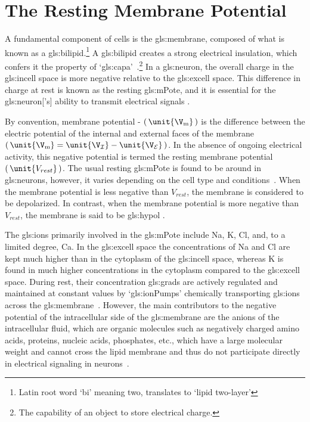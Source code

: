 \documentclass[class={myRUCProject}, crop=false]{standalone}
\begin{document}
\section{The Resting Membrane Potential} 
A fundamental component of cells is the \gls{gls:membrane}, composed of what is known as a \gls{gls:bilipid}.{}\footnote{Latin root word `bi' meaning two, translates to `lipid two-layer'} 
A \gls{gls:bilipid} creates a strong electrical insulation, which confers it the property of `\gls{gls:capa}'~\cite{Hammond2015ch3,Hammond2015ch4}.{}\footnote{The capability of an object to store electrical charge.}
In a \gls{gls:neuron}, the overall charge in the \gls{gls:incell} space is more negative relative to the \gls{gls:excell} space. This difference in charge at rest is known as the resting \gls{gls:mPote}, and it is essential for the \gls{gls:neuron}['s] ability to transmit electrical signals \cite{Hammond2015ch3,Hammond2015ch4}. 

By convention, membrane potential - \(\br{\unit{\V\membrane}}\) is the difference between the electric potential of the internal and external faces of the membrane \(\br{\unit{\V\membrane}=\unit{\V\incell}-\unit{\V\excell}}\). In the absence of ongoing electrical activity, this negative potential is termed the resting membrane potential \(\br{\unit{V_{rest}}}\). The usual resting \gls{gls:mPote} is found to be around  in \glspl{gls:neuron}, however, it varies depending on the cell type and conditions~\cite{Hammond2015ch3,Hammond2015ch4}. When the membrane potential is less negative than \(V_{rest}\), the membrane is considered to be depolarized. In contrast, when the membrane potential is more negative than \(V_{rest}\), the membrane is said to be \gls{gls:hypol} \cite{Hammond2015ch3}. 

The \glspl{gls:ion} primarily involved in the \gls{gls:mPote} include \gls{Na}, \gls{K}, \gls{Cl}, and, to a limited degree, \gls{Ca}. 
In the \gls{gls:excell} space the concentrations of \gls{Na} and \gls{Cl} are kept much higher than in the cytoplasm of the \gls{gls:incell} space, whereas \gls{K} is found in much higher concentrations in the cytoplasm compared to the \gls{gls:excell} space. 
During rest, their concentration \glspl{gls:grad} are actively regulated and maintained at constant values by `\glspl{gls:ionPump}' chemically transporting \glspl{gls:ion} across the \gls{gls:membrane}~\cite{Hammond2015ch3,Hammond2015ch4}. 
However, the main contributors to the negative potential of the intracellular side of the \gls{gls:membrane} are the anions of the intracellular fluid, which are organic molecules such as negatively charged amino acids, proteins, nucleic acids, phosphates, etc., which have a large molecular weight and cannot cross the lipid membrane and thus do not participate directly in electrical signaling in neurons~\cite{Hammond2015ch3}. 
\end{document}
